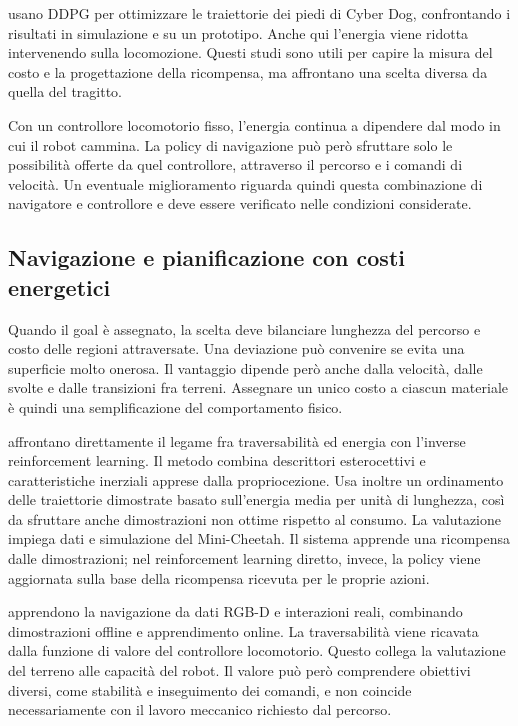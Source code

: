 \citet{Yan2024Energy} usano DDPG per ottimizzare le traiettorie dei piedi di Cyber Dog, confrontando i risultati in simulazione e su un prototipo. Anche qui l'energia viene ridotta intervenendo sulla locomozione. Questi studi sono utili per capire la misura del costo e la progettazione della ricompensa, ma affrontano una scelta diversa da quella del tragitto.

Con un controllore locomotorio fisso, l'energia continua a dipendere dal modo in cui il robot cammina. La policy di navigazione può però sfruttare solo le possibilità offerte da quel controllore, attraverso il percorso e i comandi di velocità. Un eventuale miglioramento riguarda quindi questa combinazione di navigatore e controllore e deve essere verificato nelle condizioni considerate.

\subsection{Navigazione e pianificazione con costi energetici}

Quando il goal è assegnato, la scelta deve bilanciare lunghezza del percorso e costo delle regioni attraversate. Una deviazione può convenire se evita una superficie molto onerosa. Il vantaggio dipende però anche dalla velocità, dalle svolte e dalle transizioni fra terreni. Assegnare un unico costo a ciascun materiale è quindi una semplificazione del comportamento fisico.

\citet{Gan2022Energy} affrontano direttamente il legame fra traversabilità ed energia con l'inverse reinforcement learning. Il metodo combina descrittori esterocettivi e caratteristiche inerziali apprese dalla propriocezione. Usa inoltre un ordinamento delle traiettorie dimostrate basato sull'energia media per unità di lunghezza, così da sfruttare anche dimostrazioni non ottime rispetto al consumo. La valutazione impiega dati e simulazione del Mini-Cheetah. Il sistema apprende una ricompensa dalle dimostrazioni; nel reinforcement learning diretto, invece, la policy viene aggiornata sulla base della ricompensa ricevuta per le proprie azioni.

\citet{Zhang2026Traversability} apprendono la navigazione da dati RGB-D e interazioni reali, combinando dimostrazioni offline e apprendimento online. La traversabilità viene ricavata dalla funzione di valore del controllore locomotorio. Questo collega la valutazione del terreno alle capacità del robot. Il valore può però comprendere obiettivi diversi, come stabilità e inseguimento dei comandi, e non coincide necessariamente con il lavoro meccanico richiesto dal percorso.

